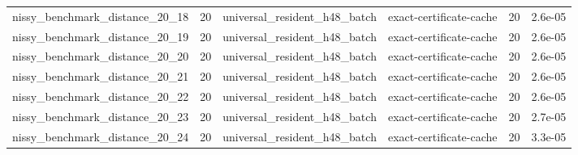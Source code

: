 {\begin{tabular}{lrllrr}
nissy\_benchmark\_distance\_20\_18 & 20 & universal\_resident\_h48\_batch & exact-certificate-cache & 20 & 2.6e-05 \\
nissy\_benchmark\_distance\_20\_19 & 20 & universal\_resident\_h48\_batch & exact-certificate-cache & 20 & 2.6e-05 \\
nissy\_benchmark\_distance\_20\_20 & 20 & universal\_resident\_h48\_batch & exact-certificate-cache & 20 & 2.6e-05 \\
nissy\_benchmark\_distance\_20\_21 & 20 & universal\_resident\_h48\_batch & exact-certificate-cache & 20 & 2.6e-05 \\
nissy\_benchmark\_distance\_20\_22 & 20 & universal\_resident\_h48\_batch & exact-certificate-cache & 20 & 2.6e-05 \\
nissy\_benchmark\_distance\_20\_23 & 20 & universal\_resident\_h48\_batch & exact-certificate-cache & 20 & 2.7e-05 \\
nissy\_benchmark\_distance\_20\_24 & 20 & universal\_resident\_h48\_batch & exact-certificate-cache & 20 & 3.3e-05 \\
\hline
\end{tabular}
}
